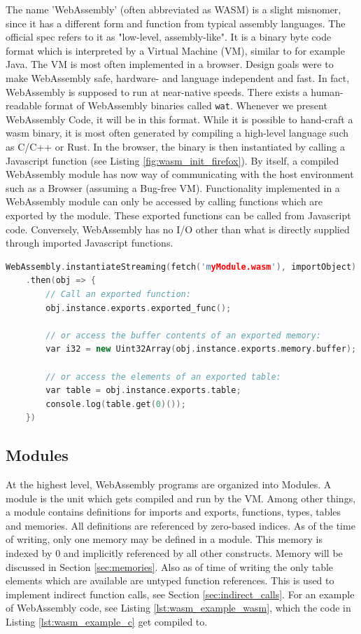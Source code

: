 \documentclass[sigconf]{acmart}
\begin{document}
The name 'WebAssembly' (often abbreviated as WASM) is a slight misnomer, since it has a different form and function from typical assembly languages. The official spec refers to it as "low-level, assembly-like". It is a binary byte code format which is interpreted by a Virtual Machine (VM), similar to for example Java. The VM is most often implemented in a browser. Design goals were to make WebAssembly safe, hardware- and language independent and fast. In fact, WebAssembly is supposed to run at near-native speeds. There exists a human-readable format of WebAssembly binaries called \texttt{wat}. Whenever we present WebAssembly Code, it will be in this format. While it is possible to hand-craft a wasm binary, it is most often generated by compiling a high-level language such as C/C++ or Rust. In the browser, the binary is then instantiated by calling a Javascript function (see Listing \ref{fig:wasm_init_firefox}). By itself, a compiled WebAssembly module has now way of communicating with the host environment such as a Browser (assuming a Bug-free VM). Functionality implemented in a WebAssembly module can only be accessed by calling functions which are exported by the module. These exported functions can be called from Javascript code. Conversely, WebAssembly has no I/O other than what is directly supplied through imported Javascript functions. 

\begin{lstlisting}[language=C++, caption={How to instantiate a WebAssembly module using Javascript. (\url{https://developer.mozilla.org/en-US/docs/WebAssembly/Loading_and_running}).}, label=fig:wasm_init_firefox]
	WebAssembly.instantiateStreaming(fetch('myModule.wasm'), importObject)
	.then(obj => {
		// Call an exported function:
		obj.instance.exports.exported_func();

		// or access the buffer contents of an exported memory:
		var i32 = new Uint32Array(obj.instance.exports.memory.buffer);

		// or access the elements of an exported table:
 		var table = obj.instance.exports.table;
		console.log(table.get(0)());
	})
\end{lstlisting}

\subsection{Modules}
At the highest level, WebAssembly programs are organized into Modules.  A module is the unit which gets compiled and run by the VM. Among other things, a module contains definitions for imports and exports, functions, types, tables and memories. All definitions are referenced by zero-based indices. As of the time of writing, only one memory may be defined in a module. This memory is indexed by 0 and implicitly referenced by all other constructs. Memory will be discussed in Section \ref{sec:memories}. Also as of time of writing the only table elements which are available are untyped function references. This is used to implement indirect function calls, see Section \ref{sec:indirect_calls}. For an example of WebAssembly code, see Listing \ref{lst:wasm_example_wasm}, which the code in Listing \ref{lst:wasm_example_c} get compiled to.
\end{document}
